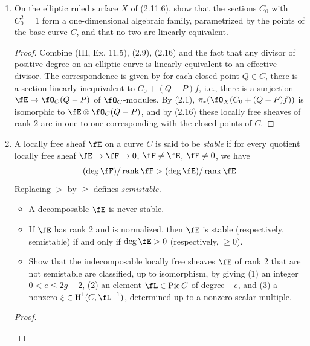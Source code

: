 \documentclass[a4paper]{article}
\begin{document}
\begin{enumerate} [label=\textbf{\arabic*.}, leftmargin=0em]
    \item On the elliptic ruled surface $X$ of (2.11.6), show that the sections $C_0$ with $C_0^2 = 1$ form a one-dimensional algebraic family, parametrized by the points of the base curve $C$, and that no two are linearly equivalent.

          \begin{proof}
              Combine (III, Ex. 11.5), (2.9), (2.16) and the fact that any divisor of positive degree on an elliptic curve is linearly equivalent to an effective divisor.
              The correspondence is given by for each closed point $Q \in C$, there is a section linearly inequivalent to $C_0 + (Q - P)f$, i.e., there is a surjection $\fE \to \fO_C(Q - P)$ of $\fO_C$-modules.
              By (2.1), $\pi_*(\fO_X(C_0 + (Q - P)f))$ is isomorphic to $\fE \otimes \fO_C(Q - P)$, and by (2.16) these locally free sheaves of rank 2 are in one-to-one corresponding with the closed points of $C$.
          \end{proof}

    \item A locally free sheaf $\fE$ on a curve $C$ is said to be \textit{stable} if for every quotient locally free sheaf $\fE \to \fF \to 0$, $\fF \neq \fE$, $\fF \neq 0$, we have
          \begin{equation*}
              (\deg{\fF}) / \rank{\fF} > (\deg{\fE}) / \rank{\fE}
          \end{equation*}
          Replacing $>$ by $\geq$ defines \textit{semistable.}
          \begin{itemize}
              \item[(a)] A decomposable $\fE$ is never stable.
              \item[(b)] If $\fE$ has rank 2 and is normalized, then $\fE$ is stable (respectively, semistable) if and only if $\deg{\fE} > 0$ (respectively, $\geq 0$).
              \item[(c)] Show that the indecomposable locally free sheaves $\fE$ of rank 2 that are not semistable are classified, up to isomorphism, by giving (1) an integer $0 < e \leq 2g - 2$, (2) an element $\fL \in \pic{C}$ of degree $-e$, and (3) a nonzero $\xi \in \cH^1(C, \fL^{-1})$, determined up to a nonzero scalar multiple.
          \end{itemize}

          \begin{proof} $ $ \vspace{0pt}
              \begin{itemize} [leftmargin=0cm]


\end{itemize}
\end{proof}
\end{enumerate}
\end{document}
